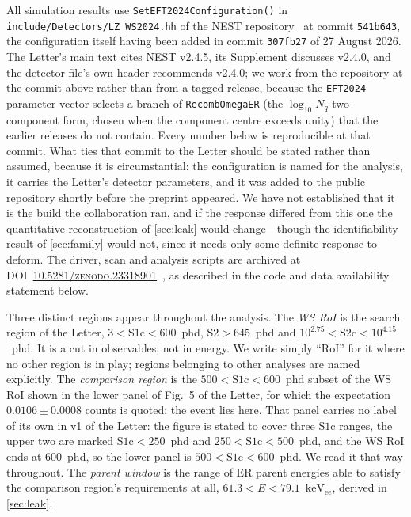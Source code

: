 \documentclass[11pt,a4paper]{article}
\newcommand{\keVee}{\ensuremath{\mathrm{keV_{ee}}}}
\begin{document}
\begin{sloppypar}
All simulation results use \texttt{SetEFT2024Configuration()} in
\texttt{include/\allowbreak Detectors/\allowbreak LZ\_WS2024.hh} of the NEST
repository~\cite{NESTcode,Szydagis:2022ikv} at commit \texttt{541b643}, the
configuration itself having been added in commit \texttt{307fb27} of 27
August 2026. The Letter's main text cites NEST v2.4.5, its Supplement
discusses v2.4.0, and the detector file's own header recommends v2.4.0;
we work from the repository at the commit above rather than from a
tagged release, because the \texttt{EFT2024} parameter vector selects a
branch of \texttt{RecombOmegaER} (the \(\log_{10}N_q\) two-component
form, chosen when the component centre exceeds unity) that the earlier
releases do not contain. Every number below is reproducible at that
commit. What ties that commit to the Letter should be stated rather than
assumed, because it is circumstantial: the configuration is named for the
analysis, it carries the Letter's detector parameters, and it was added to
the public repository shortly before the preprint appeared. We have not
established that it is the build the collaboration ran,
and if the response differed from this one the quantitative reconstruction
of \cref{sec:leak} would change---though the identifiability result of
\cref{sec:family} would not, since it needs only some definite response to
deform. The driver, scan and analysis scripts are archived at
DOI~\textsc{\href{https://zenodo.org/records/23318901}{10.5281/zenodo.23318901}}~\cite{Archive}, as described in the
code and data availability statement below. \end{sloppypar}

Three distinct regions appear throughout the analysis. The \emph{WS RoI}
is the search region of the Letter, \(3<\mathrm{S1c}<600\)~phd,
\(\mathrm{S2}>645\)~phd and \(10^{2.75}<\mathrm{S2c}<10^{4.15}\)~phd. It
is a cut in observables, not in energy. We write simply ``RoI'' for it
where no other region is in play; regions belonging to other analyses
are named explicitly. The \emph{comparison region} is the
\(500<\mathrm{S1c}<600\)~phd subset of the WS RoI shown in the lower
panel of Fig.~5 of the Letter, for which the expectation
\(0.0106\pm0.0008\) counts is quoted; the event lies here. That panel
carries no label of its own in v1 of the Letter: the figure is stated to
cover three \(\mathrm{S1c}\) ranges, the upper two are marked
\(\mathrm{S1c}<250\)~phd and \(250<\mathrm{S1c}<500\)~phd, and the WS
RoI ends at \(600\)~phd, so the lower panel is
\(500<\mathrm{S1c}<600\)~phd. We read it that way throughout.  The
\emph{parent window} is the range of ER parent energies able to satisfy
the comparison region's requirements at all, \(61.3<E<79.1\)~\keVee,
derived in \cref{sec:leak}.
\end{document}
